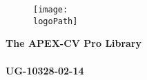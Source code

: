 \documentclass[oneside]{book}
\newcommand{\docTitleLineOne}{The APEX-CV Pro Library}    %
\newcommand{\docTitleLineTwo}{}          %
\newcommand{\docID}{UG-10328-02-14}      %
\newcommand{\logoPath}{../../../../../script/doxygen/NXP_logo_RGB_512x960.pdf}   %
\newcommand{\+}{\discretionary{\mbox{\scriptsize$\hookleftarrow$}}{}{}}
\begin{document}
\pagestyle{empty} %

\begin{figure}
	\centering
	\texttt{[image: \\logoPath]}
\end{figure}

\vspace*{2.5cm}
\begin{flushright}
	\Huge
	\textbf{ \docTitleLineOne} \vspace*{0.4cm} \\ 
	\textbf{ \docTitleLineTwo} \\
	\huge
	\vspace*{2.0cm}
	\textbf{\docID}
\end{flushright}
\vspace*{2.4cm}
\end{document}
